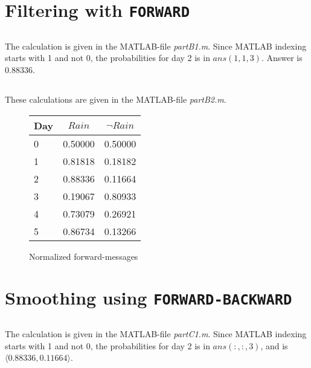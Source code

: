 \documentclass[english]{article}
\begin{document}
\newpage
\section{Filtering with \texttt{FORWARD}}
\subsection{}
The calculation is given in the MATLAB-file \emph{partB1.m}. Since MATLAB
indexing starts with 1 and not 0, the probabilities for day 2 is in
\(ans(1,1,3)\). Answer is 0.88336.

\subsection{}
These calculations are given in the MATLAB-file \emph{partB2.m}.
\begin{figure}[h]
\begin{tabular}{|l||c|c|}
\hline
Day & \(Rain\) & \(\lnot Rain\) \\
\hline
\hline
0 & 0.50000 & 0.50000\\
1 & 0.81818 & 0.18182\\
2 & 0.88336 & 0.11664\\
3 & 0.19067 & 0.80933\\
4 & 0.73079 & 0.26921\\
5 & 0.86734 & 0.13266\\
\hline
\end{tabular}
\caption{Normalized forward-messages}
\end{figure}

\newpage
\section{Smoothing using \texttt{FORWARD-BACKWARD}}
\subsection{}
The calculation is given in the MATLAB-file \emph{partC1.m}. Since MATLAB
indexing starts with 1 and not 0, the probabilities for day 2 is in
\(ans(:,:,3)\), and is \(\langle 0.88336, 0.11664\rangle\).
\end{document}
